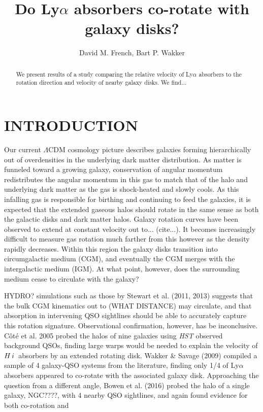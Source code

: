 \documentclass[iop]{emulateapj-rtx4}
\newcommand{\HI}{$H\,{\sc i}$}
\begin{document}
\title{Do Ly$\alpha$ absorbers co-rotate with galaxy disks?}

\author{David M. French, Bart P. Wakker}


\begin{abstract}

We present results of a study comparing the relative velocity of Ly$\alpha$ absorbers to the rotation direction and velocity of nearby galaxy disks. We find...

\end{abstract}




\section{INTRODUCTION}
Our current $\Lambda$CDM cosmology picture describes galaxies forming hierarchically out of overdensities in the underlying dark matter distribution. As matter is funneled toward a growing galaxy, conservation of angular momentum redistributes the angular momentum in this gas to match that of the halo and underlying dark matter as the gas is shock-heated and slowly cools. As this infalling gas is responsible for birthing and continuing to feed the galaxies, it is expected that the extended gaseous halos should rotate in the same sense as both the galactic disks and dark matter halos. Galaxy rotation curves have been observed to extend at constant velocity out to... (cite...). It becomes increasingly difficult to measure gas rotation much farther from this however as the density rapidly decreases. Within this region the galaxy disks transition into circumgalactic medium (CGM), and eventually the CGM merges with the intergalactic medium (IGM). At what point, however, does the surrounding medium cease to circulate with the galaxy? 

HYDRO? simulations such as those by Stewart et al. (2011, 2013) suggests that the bulk CGM kinematics out to (WHAT DISTANCE) may circulate, and that absorption in intervening QSO sightlines should be able to accurately capture this rotation signature. Observational confirmation, however, has be inconclusive. C\^{o}t\'{e} et al. 2005 probed the halos of nine galaxies using \emph{HST} observed background QSOs, finding large warps would be needed to explain the velocity of \HI~absorbers by an extended rotating disk. Wakker \& Savage (2009) compiled a sample of 4 galaxy-QSO systems from the literature, finding only 1/4 of Ly$\alpha$ absorbers appeared to co-rotate with the associated galaxy disk. Approaching the question from a different angle, Bowen et al. (2016) probed the halo of a single galaxy, NGC????, with 4 nearby QSO sightlines, and again found evidence for both co-rotation and 
\end{document}
